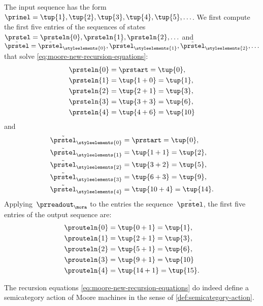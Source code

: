 \begin{example}
    The input sequence has the form~$\prinel = \tup{1}, \tup{2}, \tup{3}, \tup{4}, \tup{5}, \ldots$.
    We first compute the first five entries of the sequences of states~$\prstel = \prsteln{0}, \prsteln{1}, \prsteln{2}, \ldots$ and~$\tilde{\prstel} = \tilde{\prstel}_\styleelements{0}, \tilde{\prstel}_\styleelements{1}, \tilde{\prstel}_\styleelements{2}, \ldots$ that solve \cref{eq:moore-new-recursion-equations}:
    \begin{align*}
        \prsteln{0} & = \prstart = \tup{0}, \\
        \prsteln{1} & = \tup{1 + 0} = \tup{1}, \\
        \prsteln{2} & = \tup{2 + 1} = \tup{3}, \\
        \prsteln{3} & = \tup{3 + 3} = \tup{6}, \\
        \prsteln{4} & = \tup{4 + 6} = \tup{10}
    \end{align*}
    and
    \begin{align*}
        \tilde{\prstel}_\styleelements{0} & = \prstart = \tup{0}, \\
        \tilde{\prstel}_\styleelements{1} & = \tup{1 + 1} = \tup{2}, \\
        \tilde{\prstel}_\styleelements{2} & = \tup{3 + 2} = \tup{5}, \\
        \tilde{\prstel}_\styleelements{3} & = \tup{6 + 3} = \tup{9}, \\
        \tilde{\prstel}_\styleelements{4} & = \tup{10 + 4} = \tup{14}.
    \end{align*}
    Applying~$\prreadout_\mora$ to the entries the sequence~$\tilde \prstel$, the first five entries of the output sequence are:
    \begin{align*}
        \prouteln{0} & = \tup{0 + 1} = \tup{1}, \\
        \prouteln{1} & = \tup{2 + 1} = \tup{3}, \\
        \prouteln{2} & = \tup{5 + 1} = \tup{6}, \\
        \prouteln{3} & = \tup{9 + 1} = \tup{10} \\
        \prouteln{4} & = \tup{14 + 1} = \tup{15}.
    \end{align*}
\end{example}


\begin{lemma}
    The recursion equations \cref{eq:moore-new-recursion-equations} do indeed define a semicategory action of Moore machines in the sense of \cref{def:semicategory-action}.
\end{lemma}

